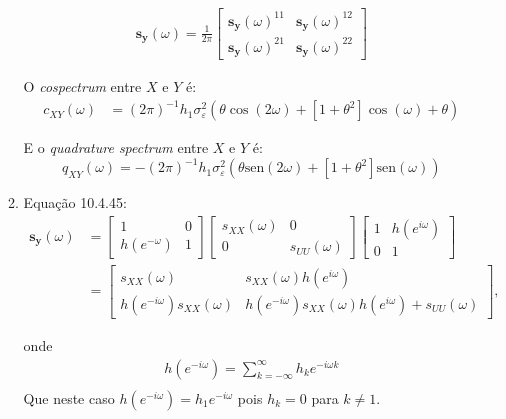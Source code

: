 \begin{enumerate}
\begin{enumerate}
	\begin{align*}
		\mathbf{s}_{\mathbf{y}}(\omega)=\frac{1}{2\pi}\begin{bmatrix*}
			\mathbf{s}_{\mathbf{y}}(\omega)^{11}&\mathbf{s}_{\mathbf{y}}(\omega)^{12}\\
			\mathbf{s}_{\mathbf{y}}(\omega)^{21}&\mathbf{s}_{\mathbf{y}}(\omega)^{22}
		\end{bmatrix*}
		\end{align*}
	
	O \emph{cospectrum} entre $X$ e $Y$ é:
	\begin{align*}
		c_{XY}(\omega)&=(2\pi)^{-1}h_1\sigma^2_{\varepsilon}(\theta\cos(2\omega)+[1+\theta^2]\cos(\omega)+\theta)
	\end{align*}

	E o \emph{quadrature spectrum} entre $X$ e $Y$ é:
	$$q_{XY}(\omega)=-(2\pi)^{-1}h_1\sigma^2_{\varepsilon}(\theta\text{sen}(2\omega)+[1+\theta^2]\text{sen}(\omega))$$
	
	
	\item %
	
	Equação 10.4.45:
	\begin{align*}
		\mathbf{s}_{\mathbf{y}}(\omega)&=\begin{bmatrix}
	1&0\\
	h(e^{-\omega})&1
	\end{bmatrix}\begin{bmatrix}
	s_{XX}(\omega)&0\\0&s_{UU}(\omega)
	\end{bmatrix}\begin{bmatrix}
	1&h(e^{i\omega})\\0&1
	\end{bmatrix}\\
	&=\begin{bmatrix}
	s_{XX}(\omega)&s_{XX}(\omega)h(e^{i\omega})\\
	h(e^{-i\omega})s_{XX}(\omega)&h(e^{-i\omega})s_{XX}(\omega)h(e^{i\omega})+s_{UU}(\omega)
	\end{bmatrix},
	\end{align*}
	
	onde
	\begin{align*}
		h(e^{-i\omega})=\sum\limits_{k=-\infty}^{\infty}h_ke^{-i\omega k}\\
	\end{align*}
Que neste caso  $h(e^{-i\omega})=h_1e^{-i\omega}$ pois $h_k=0$ para $k \neq 1$.
	

\end{enumerate}
\end{enumerate}
